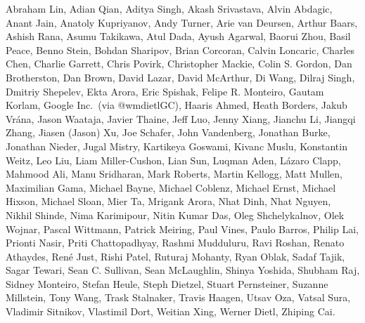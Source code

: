 Abraham Lin,
Adian Qian,
Aditya Singh,
Akash Srivastava,
Alvin Abdagic,
Anant Jain,
Anatoly Kupriyanov,
Andy Turner,
Arie van Deursen,
Arthur Baars,
Ashish Rana,
Asumu Takikawa,
Atul Dada,
Ayush Agarwal,
Baorui Zhou,
Basil Peace,
Benno Stein,
Bohdan Sharipov,
Brian Corcoran,
Calvin Loncaric,
Charles Chen,
Charlie Garrett,
Chris Povirk,
Christopher Mackie,
Colin S. Gordon,
Dan Brotherston,
Dan Brown,
David Lazar,
David McArthur,
Di Wang,
Dilraj Singh,
Dmitriy Shepelev,
Ekta Arora,
Eric Spishak,
Felipe R. Monteiro,
Gautam Korlam,
Google Inc.\ (via @wmdietlGC),
Haaris Ahmed,
Heath Borders,
Jakub Vr\'ana,
Jason Waataja,
Javier Thaine,
Jeff Luo,
Jenny Xiang,
Jianchu Li,
Jiangqi Zhang,
Jiasen (Jason) Xu,
Joe Schafer,
John Vandenberg,
Jonathan Burke,
Jonathan Nieder,
Jugal Mistry,
Kartikeya Goswami,
Kivanc Muslu,
Konstantin Weitz,
Leo Liu,
Liam Miller-Cushon,
Lian Sun,
Luqman Aden,
L\'azaro Clapp,
Mahmood Ali,
Manu Sridharan,
Mark Roberts,
Martin Kellogg,
Matt Mullen,
Maximilian Gama,
Michael Bayne,
Michael Coblenz,
Michael Ernst,
Michael Hixson,
Michael Sloan,
Mier Ta,
Mrigank Arora,
Nhat Dinh,
Nhat Nguyen,
Nikhil Shinde,
Nima Karimipour,
Nitin Kumar Das,
Oleg Shchelykalnov,
Olek Wojnar,
Pascal Wittmann,
Patrick Meiring,
Paul Vines,
Paulo Barros,
Philip Lai,
Prionti Nasir,
Priti Chattopadhyay,
Rashmi Mudduluru,
Ravi Roshan,
Renato Athaydes,
Ren\'e Just,
Rishi Patel,
Ruturaj Mohanty,
Ryan Oblak,
Sadaf Tajik,
Sagar Tewari,
Sean C. Sullivan,
Sean McLaughlin,
Shinya Yoshida,
Shubham Raj,
Sidney Monteiro,
Stefan Heule,
Steph Dietzel,
Stuart Pernsteiner,
Suzanne Millstein,
Tony Wang,
Trask Stalnaker,
Travis Haagen,
Utsav Oza,
Vatsal Sura,
Vladimir Sitnikov,
Vlastimil Dort,
Weitian Xing,
Werner Dietl,
Zhiping Cai.
